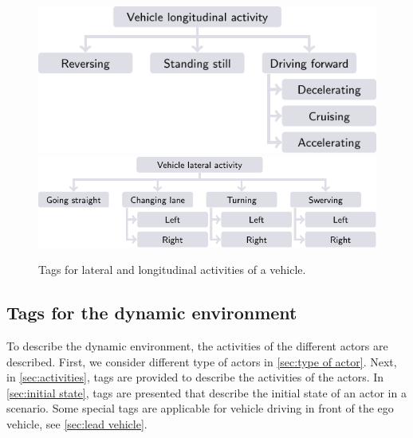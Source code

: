 \documentclass[twoside,twocolumn,9pt]{extarticle}
\theoremstyle{plain}
\begin{document}
\begin{figure}[t!]
	\centering
	\includegraphics{lon_activity}\\
	\vspace{0.5em}
	\includegraphics{lat_activity}
	\caption{Tags for lateral and longitudinal activities of a vehicle. 
	}
	\label{fig:activities}
\end{figure}


\subsection{Tags for the dynamic environment}
\label{sec:selection of tags dynamic}

To describe the dynamic environment, the activities of the different actors are described. First, we consider different type of actors in \cref{sec:type of actor}. Next, in \cref{sec:activities}, tags are provided to describe the activities of the actors. In \cref{sec:initial state}, tags are presented that describe the initial state of an actor in a scenario. Some special tags are applicable for vehicle driving in front of the ego vehicle, see \cref{sec:lead vehicle}. %
\end{document}
